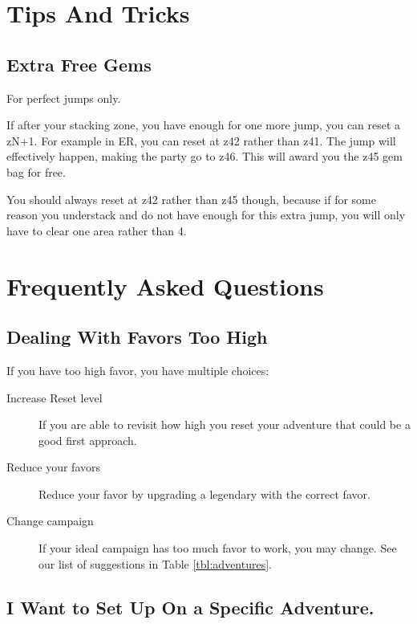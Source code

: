\documentclass{article}
\begin{document}
\section{Tips And Tricks}

\subsection{Extra Free Gems}

For perfect jumps only.

If after your stacking zone, you have enough for one more jump, you can reset a zN+1.
For example in ER, you can reset at z42 rather than z41.
The jump will effectively happen, making the party go to z46.
This will award you the z45 gem bag for free.

You should always reset at z42 rather than z45 though, because if for some reason you understack and do not have enough for this extra jump, you will only have to clear one area rather than 4.



\section{Frequently Asked Questions}




\subsection{Dealing With Favors Too High}

If you have too high favor, you have multiple choices:
\begin{description}
    \item[Increase Reset level] If you are able to revisit how high you reset your adventure that could be a good first approach.
    \item[Reduce your favors] Reduce your favor by upgrading a legendary with the correct favor.
    \item[Change campaign] If your ideal campaign has too much favor to work, you may change.
    See our list of suggestions in Table \ref{tbl:adventures}.
\end{description}

\subsection{I Want to Set Up On a Specific Adventure.}
\end{document}
